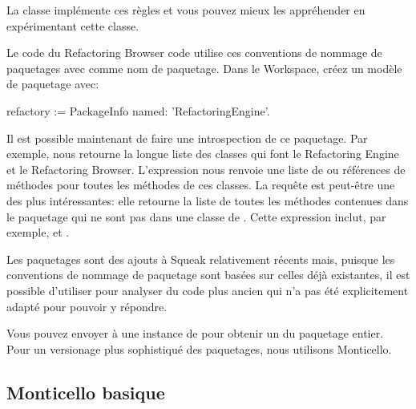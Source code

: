 \documentclass[a4paper,10pt,twoside]{book}
\begin{document}
La classe  impl\'emente ces r\`egles et vous pouvez 
mieux les appr\'ehender en exp\'erimentant cette classe.

Le code du Refactoring Browser code utilise ces conventions de nommage de
paquetages avec  comme nom de paquetage. 
Dans le Workspace, cr\'eez un mod\`ele de paquetage avec:


\begin{code}{}
refactory := PackageInfo named: 'RefactoringEngine'.
\end{code}

Il est possible maintenant de faire une introspection de ce paquetage.
Par exemple,  nous retourne la longue liste
des classes qui font le Refactoring Engine et le Refactoring Browser.  
L'expression 
nous renvoie une liste de \mbox{} ou r\'ef\'erences de m\'ethodes
pour toutes les m\'ethodes de ces classes.
La requ\^ete  est peut-\^etre une des plus
int\'eressantes: elle retourne la liste de toutes les m\'ethodes contenues
dans le paquetage  qui ne sont pas dans une classe de . 
Cette expression inclut, par exemple,  et .

Les paquetages sont des ajouts \`a Squeak relativement r\'ecents
mais, puisque les conventions de nommage de paquetage sont bas\'ees
sur celles d\'ej\`a existantes, il est possible d'utiliser
 pour analyser du code plus ancien qui n'a pas 
\'et\'e explicitement adapt\'e pour pouvoir y r\'epondre.


Vous pouvez envoyer  \`a une instance de  
pour obtenir un \changeset du paquetage entier.
Pour un versionage plus sophistiqu\'e des paquetages, nous utilisons 
Monticello.

\subsection{Monticello basique}
\end{document}
